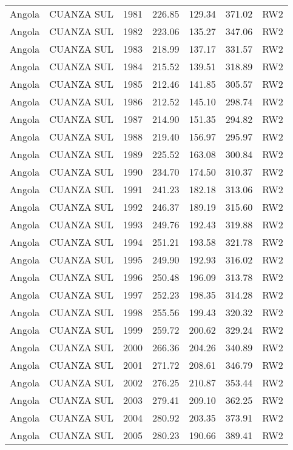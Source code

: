 \begin{longtable}{lllrrrl}
  Angola & CUANZA SUL & 1981 & 226.85 & 129.34 & 371.02 & RW2 \\ 
  Angola & CUANZA SUL & 1982 & 223.06 & 135.27 & 347.06 & RW2 \\ 
  Angola & CUANZA SUL & 1983 & 218.99 & 137.17 & 331.57 & RW2 \\ 
  Angola & CUANZA SUL & 1984 & 215.52 & 139.51 & 318.89 & RW2 \\ 
  Angola & CUANZA SUL & 1985 & 212.46 & 141.85 & 305.57 & RW2 \\ 
  Angola & CUANZA SUL & 1986 & 212.52 & 145.10 & 298.74 & RW2 \\ 
  Angola & CUANZA SUL & 1987 & 214.90 & 151.35 & 294.82 & RW2 \\ 
  Angola & CUANZA SUL & 1988 & 219.40 & 156.97 & 295.97 & RW2 \\ 
  Angola & CUANZA SUL & 1989 & 225.52 & 163.08 & 300.84 & RW2 \\ 
  Angola & CUANZA SUL & 1990 & 234.70 & 174.50 & 310.37 & RW2 \\ 
  Angola & CUANZA SUL & 1991 & 241.23 & 182.18 & 313.06 & RW2 \\ 
  Angola & CUANZA SUL & 1992 & 246.37 & 189.19 & 315.60 & RW2 \\ 
  Angola & CUANZA SUL & 1993 & 249.76 & 192.43 & 319.88 & RW2 \\ 
  Angola & CUANZA SUL & 1994 & 251.21 & 193.58 & 321.78 & RW2 \\ 
  Angola & CUANZA SUL & 1995 & 249.90 & 192.93 & 316.02 & RW2 \\ 
  Angola & CUANZA SUL & 1996 & 250.48 & 196.09 & 313.78 & RW2 \\ 
  Angola & CUANZA SUL & 1997 & 252.23 & 198.35 & 314.28 & RW2 \\ 
  Angola & CUANZA SUL & 1998 & 255.56 & 199.43 & 320.32 & RW2 \\ 
  Angola & CUANZA SUL & 1999 & 259.72 & 200.62 & 329.24 & RW2 \\ 
  Angola & CUANZA SUL & 2000 & 266.36 & 204.26 & 340.89 & RW2 \\ 
  Angola & CUANZA SUL & 2001 & 271.72 & 208.61 & 346.79 & RW2 \\ 
  Angola & CUANZA SUL & 2002 & 276.25 & 210.87 & 353.44 & RW2 \\ 
  Angola & CUANZA SUL & 2003 & 279.41 & 209.10 & 362.25 & RW2 \\ 
  Angola & CUANZA SUL & 2004 & 280.92 & 203.35 & 373.91 & RW2 \\ 
  Angola & CUANZA SUL & 2005 & 280.23 & 190.66 & 389.41 & RW2 \\ 

\end{longtable}
